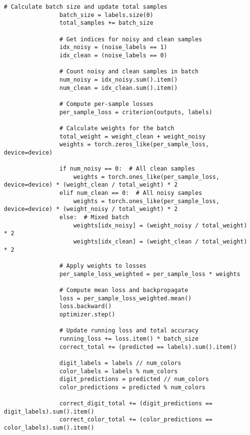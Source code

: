 \begin{lstlisting}[style=pythonstyle, caption={メインコード}]
                # Calculate batch size and update total samples
                batch_size = labels.size(0)
                total_samples += batch_size
    
                # Get indices for noisy and clean samples
                idx_noisy = (noise_labels == 1)
                idx_clean = (noise_labels == 0)
    
                # Count noisy and clean samples in batch
                num_noisy = idx_noisy.sum().item()
                num_clean = idx_clean.sum().item()
    
                # Compute per-sample losses
                per_sample_loss = criterion(outputs, labels)
    
                # Calculate weights for the batch
                total_weight = weight_clean + weight_noisy
                weights = torch.zeros_like(per_sample_loss, device=device)
                
                if num_noisy == 0:  # All clean samples
                    weights = torch.ones_like(per_sample_loss, device=device) * (weight_clean / total_weight) * 2
                elif num_clean == 0:  # All noisy samples
                    weights = torch.ones_like(per_sample_loss, device=device) * (weight_noisy / total_weight) * 2
                else:  # Mixed batch
                    weights[idx_noisy] = (weight_noisy / total_weight) * 2
                    weights[idx_clean] = (weight_clean / total_weight) * 2
    
                # Apply weights to losses
                per_sample_loss_weighted = per_sample_loss * weights
    
                # Compute mean loss and backpropagate
                loss = per_sample_loss_weighted.mean()
                loss.backward()
                optimizer.step()
    
                # Update running loss and total accuracy
                running_loss += loss.item() * batch_size
                correct_total += (predicted == labels).sum().item()
    
                digit_labels = labels // num_colors
                color_labels = labels % num_colors
                digit_predictions = predicted // num_colors
                color_predictions = predicted % num_colors
    
                correct_digit_total += (digit_predictions == digit_labels).sum().item()
                correct_color_total += (color_predictions == color_labels).sum().item()
    

\end{lstlisting}
